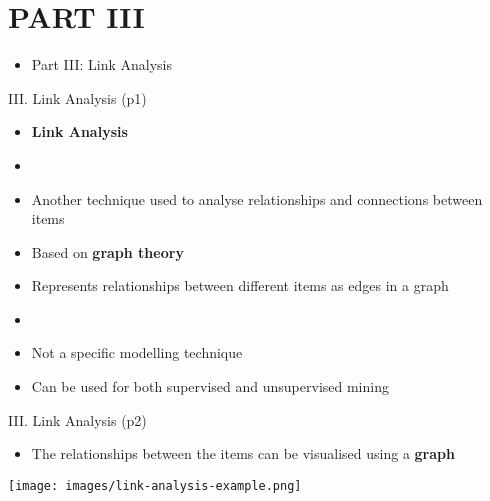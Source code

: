 \documentclass[handout]{beamer}
\newcommand{\strong}[1]{\textbf{\color{teal} #1}}
\newcommand{\stronger}[1]{\textbf{\color{purple} #1}}
\begin{document}
\section{PART III}
\begin{frame}{}
\begin{itemize}
\item[] Part III: Link Analysis
\end{itemize}
\end{frame}
\begin{frame}{III. Link Analysis (p1)}
\begin{itemize}
\item[] \stronger{Link Analysis}
\item[]
\item Another technique used to analyse relationships and connections between items
\item Based on \strong{graph theory}
\item Represents relationships between different items as edges in a graph
\item[]
\item Not a specific modelling technique
\item Can be used for both supervised and unsupervised mining
\end{itemize}
\end{frame}
\begin{frame}{III. Link Analysis (p2)}
\begin{itemize}
\item The relationships between the items can be visualised using a \stronger{graph}
\end{itemize}
\begin{center}
\texttt{[image: images/link-analysis-example.png]}
\end{center}
\end{frame}
\end{document}
